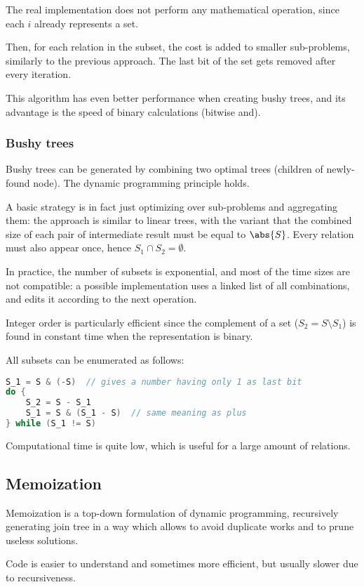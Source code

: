 The real implementation does not perform any mathematical operation, since each $i$ already represents a set. 

Then, for each relation in the subset, the cost is added to smaller sub-problems, similarly to the previous approach. The last bit of the set gets removed after every iteration.

This algorithm has even better performance when creating bushy trees, and its advantage is the speed of binary calculations (bitwise and). 

\subsubsection{Bushy trees}
Bushy trees can be generated by combining two optimal trees (children of newly-found node). The dynamic programming principle holds.

A basic strategy is in fact just optimizing over sub-problems and aggregating them: the approach is similar to linear trees, with the variant that the combined size of each pair of intermediate result must be equal to $\abs{S}$. Every relation must also appear once, hence $S_1 \cap S_2 = \emptyset$.

In practice, the number of subsets is exponential, and most of the time sizes are not compatible: a possible implementation uses a linked list of all combinations, and edits it according to the next operation.

Integer order is particularly efficient since the complement of a set ($S_2 = S \setminus S_1$) is found in constant time when the representation is binary.

All subsets can be enumerated as follows:
\begin{lstlisting}[language=C++]
S_1 = S & (-S)  // gives a number having only 1 as last bit
do {
	S_2 = S - S_1
	S_1 = S & (S_1 - S)  // same meaning as plus
} while (S_1 != S)
\end{lstlisting}
Computational time is quite low, which is useful for a large amount of relations.

\subsection{Memoization}
Memoization is a top-down formulation of dynamic programming, recursively generating join tree in a way which allows to avoid duplicate works and to prune useless solutions.

Code is easier to understand and sometimes more efficient, but usually slower due to recursiveness.

